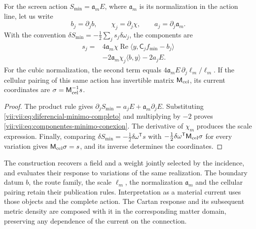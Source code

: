 \begin{theorem}
\label{vii:vii:thm:componentes-minimo-conexion}
For the screen action \(S_{\min}=\mathfrak a_m E\), where \(\mathfrak a_m\) is its normalization in the action line, let us write
\[
 b_j=\partial_jb,\qquad \chi_j=\partial_j\chi,
 \qquad a_j=\partial_j\mathfrak a_m.
\]
With the convention \(\delta S_{\min}=-\tfrac12\sum_j s_j\delta\omega_j\),
the components are
\begin{equation}
 \begin{split}
 s_j={}&4\mathfrak a_m\chi\operatorname{Re}
             \langle y,\mathsf C_jf_{\min}-b_j\rangle\\
      &-2\mathfrak a_m\chi_j\langle b,y\rangle-2a_jE.
 \end{split}
 \label{vii:vii:eq:componentes-minimo-conexion}
\end{equation}
For the cubic normalization, the second term equals \(4\mathfrak a_m E\,\partial_j\ell_m/\ell_m\). If the cellular pairing of this same action has invertible matrix \(\mathsf M_{\rm cel}\), its current coordinates are \(\sigma=\mathsf M_{\rm cel}^{-1}s\).
\end{theorem}

\begin{proof}
The product rule gives \(\partial_jS_{\min}=a_jE+\mathfrak a_m\partial_jE\). Substituting \eqref{vii:vii:eq:diferencial-minimo-completo} and multiplying by \(-2\) proves \eqref{vii:vii:eq:componentes-minimo-conexion}. The derivative of \(\chi_m\) produces the scale expression. Finally, comparing \(\delta S_{\min}=-\tfrac12\delta\omega^{\mathsf T}s\) with \(-\tfrac12\delta\omega^{\mathsf T}\mathsf M_{\rm cel}\sigma\) for every variation gives \(\mathsf M_{\rm cel}\sigma=s\), and its inverse determines the coordinates.
\end{proof}

The construction recovers a field and a weight jointly selected
by the incidence, and evaluates their response to variations of the same
realization. The boundary datum \(b\), the route family, the scale
\(\ell_m\), the normalization \(\mathfrak a_m\) and the cellular
pairing retain their publication rules. Interpretation as a
material current uses those objects and the complete action. The
Cartan response and its subsequent metric density are composed with
it in the corresponding matter domain, preserving any
dependence of the current on the connection.
